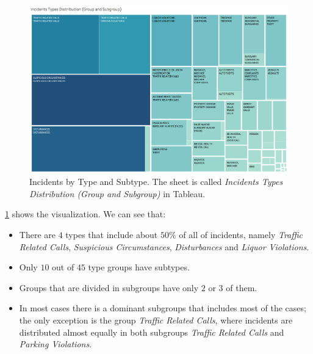 \begin{figure}[h]
	\centering
	\includegraphics[width=\columnwidth]{figures/4_3_groups_subgroups}
	\caption{Incidents by Type and Subtype. The sheet is called \textit{Incidents Types Distribution (Group and Subgroup)} in Tableau.}
	\label{fig:4_3_groups_subgroups}
\end{figure}

\cref{fig:4_3_groups_subgroups} shows the visualization.
We can see that:
\begin{itemize}
	\item There are $4$ types that include about $50\%$ of all of incidents, namely \textit{Traffic Related Calls}, \textit{Suspicious Circumstances}, \textit{Disturbances} and \textit{Liquor Violations}.
	\item Only $10$ out of $45$ type groups have subtypes.
	\item Groups that are divided in subgroups have only $2$ or $3$ of them.
	\item In most cases there is a dominant subgroups that includes most of the cases; the only exception is the group \textit{Traffic Related Calls}, where incidents are distributed almost equally in both subgroups \textit{Traffic Related Calls} and \textit{Parking Violations}.
\end{itemize}
